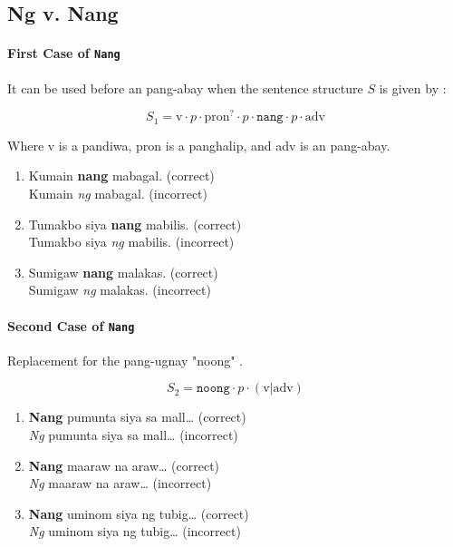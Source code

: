 \subsection{Ng v. Nang}

\paragraph{First Case of \texttt{Nang}} It can be used before an pang-abay when the sentence structure $S$ is given by \cite{KWF}:

\[
      S_1 = \text{v} \cdot p \cdot \text{pron}^? \cdot p \cdot \texttt{nang} \cdot p \cdot \text{adv}
\]

Where v is a pandiwa, pron is a panghalip, and adv is an pang-abay.

\begin{example}
\end{example}

\begin{enumerate}
      \item Kumain \textbf{nang} mabagal. (correct)
            \\ Kumain \textit{ng} mabagal. (incorrect)
      \item Tumakbo siya \textbf{nang} mabilis. (correct)
            \\ Tumakbo siya \textit{ng} mabilis. (incorrect)
      \item Sumigaw \textbf{nang} malakas. (correct)
            \\ Sumigaw \textit{ng} malakas. (incorrect)
\end{enumerate}

\paragraph{Second Case of \texttt{Nang}} Replacement for the pang-ugnay "noong" \cite{KWF}.

\[
      S_2 = \texttt{noong} \cdot p \cdot (\text{v} \vert \text{adv})
\]

\begin{example}

\end{example}

\begin{enumerate}
      \item \textbf{Nang} pumunta siya sa mall… (correct)
        \\ \textit{Ng} pumunta siya sa mall… (incorrect)
      \item \textbf{Nang} maaraw na araw… (correct)
            \\ \textit{Ng} maaraw na araw… (incorrect)
            \item \textbf{Nang} uminom siya ng tubig… (correct)
            \\ \textit{Ng} uminom siya ng tubig… (incorrect)
\end{enumerate}

